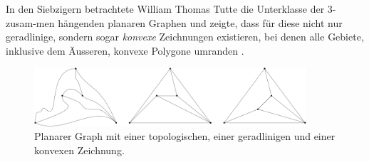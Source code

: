 In den Siebzigern betrachtete William Thomas Tutte die Unterklasse der 3-zusam-men hängenden planaren Graphen und zeigte, dass für diese nicht nur geradlinige, sondern sogar \textit{konvexe} Zeichnungen existieren, bei denen alle Gebiete, inklusive dem Äusseren, konvexe Polygone umranden \cite{tutte63}.

\begin{figure}
	\centering
  \includegraphics[width=0.9\textwidth]{topo_straight_convex.png}
	\caption{Planarer Graph mit einer topologischen, einer geradlinigen und einer konvexen Zeichnung.}
	\label{topo_straight_convex}
\end{figure}





